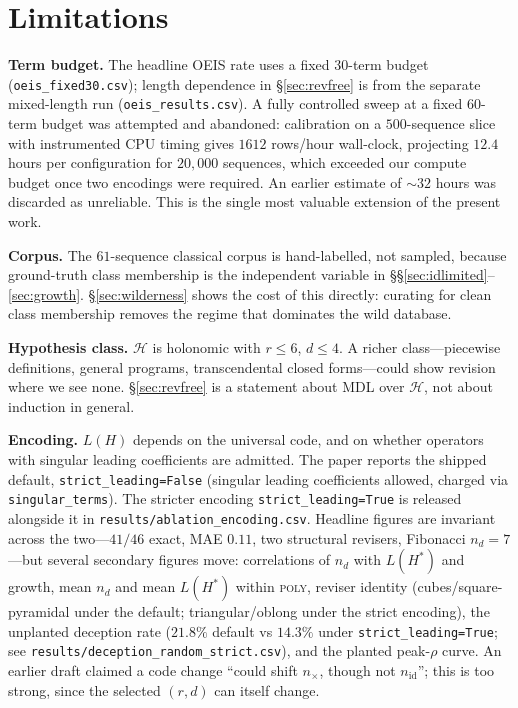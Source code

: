 \documentclass[10pt]{article}
\theoremstyle{definition}
\theoremstyle{plain}
\newcommand{\nid}{n_{\mathrm{id}}}
\newcommand{\nx}{n_{\times}}
\newcommand{\nd}{n_{d}}
\newcommand{\Prec}{\mathcal{H}}
\begin{document}
\section{Limitations}
\label{sec:limitations}

\textbf{Term budget.} The headline OEIS rate uses a fixed $30$-term budget
(\texttt{oeis\_fixed30.csv}); length dependence in \S\ref{sec:revfree} is
from the separate mixed-length run (\texttt{oeis\_results.csv}). A fully
controlled sweep at a fixed $60$-term budget was attempted and abandoned: calibration on a $500$-sequence
slice with instrumented CPU timing gives $1612$ rows/hour wall-clock,
projecting $12.4$ hours per configuration for $20{,}000$ sequences, which
exceeded our compute budget once two encodings were required. An earlier
estimate of $\sim32$ hours was discarded as unreliable. This is the single most
valuable extension of the present work.

\textbf{Corpus.} The $61$-sequence classical corpus is hand-labelled, not
sampled, because ground-truth class membership is the independent variable in
\S\S\ref{sec:idlimited}--\ref{sec:growth}. \S\ref{sec:wilderness} shows the
cost of this directly: curating for clean class membership removes the regime
that dominates the wild database.

\textbf{Hypothesis class.} $\Prec$ is holonomic with $r \le 6$, $d \le 4$. A
richer class---piecewise definitions, general programs, transcendental closed
forms---could show revision where we see none. \S\ref{sec:revfree} is a statement about
MDL over $\Prec$, not about induction in general.

\textbf{Encoding.} $L(H)$ depends on the universal code, and on whether
operators with singular leading coefficients are admitted. The paper reports
the shipped default, \texttt{strict\_leading=False} (singular leading
coefficients allowed, charged via \texttt{singular\_terms}). The stricter
encoding \texttt{strict\_leading=True} is released alongside it in
\texttt{results/ablation\_encoding.csv}. Headline figures are invariant across
the two---$41/46$ exact, MAE $0.11$, two structural revisers, Fibonacci
$\nd = 7$---but several secondary figures move: correlations of $\nd$ with
$L(H^{*})$ and growth, mean $\nd$ and mean $L(H^{*})$ within
\textsc{poly}, reviser identity (cubes/square-pyramidal under the default;
triangular/oblong under the strict encoding), the unplanted deception rate
($21.8\%$ default vs $14.3\%$ under \texttt{strict\_leading=True}; see
\texttt{results/deception\_random\_strict.csv}), and the planted peak-$\rho$
curve. An earlier draft claimed a code change ``could shift $\nx$, though not
$\nid$''; this is too strong, since the selected $(r,d)$ can itself change.
\end{document}
